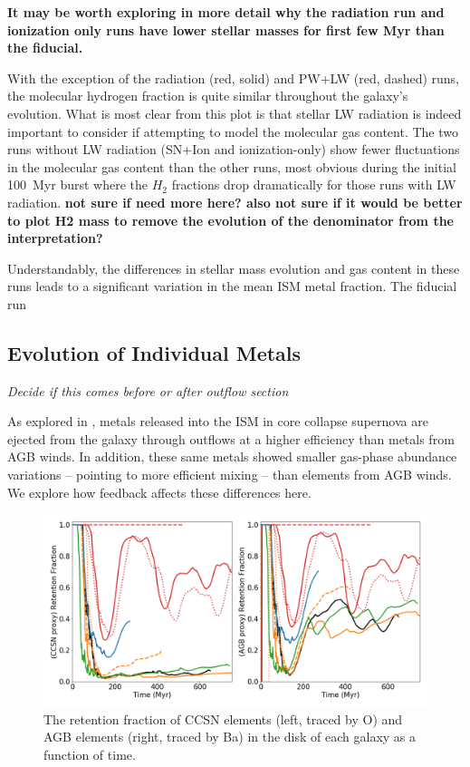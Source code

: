\documentclass[twocolumn]{aastex62}
\newcommand{\radstyle}{red, solid}
\newcommand{\pelwstyle}{red, dashed}
\begin{document}
\textbf{It may be worth exploring in more detail why the radiation run and ionization only runs have lower stellar masses for first few Myr than the fiducial.}

With the exception of the radiation (\radstyle) and PW+LW (\pelwstyle) runs, the molecular hydrogen fraction is quite similar throughout the galaxy's evolution. What is most clear from this plot is that stellar LW radiation is indeed important to consider if attempting to model the molecular gas content. The two runs without LW radiation (SN+Ion and ionization-only) show fewer fluctuations in the molecular gas content than the other runs, most obvious during the initial 100~Myr burst where the $H_2$ fractions drop dramatically for those runs with LW radiation. \textbf{not sure if need more here? also not sure if it would be better to plot H2 mass to remove the evolution of the denominator from the interpretation?}

Understandably, the differences in stellar mass evolution and gas content in these runs leads to a significant variation in the mean ISM metal fraction. The fiducial run 

\subsection{Evolution of Individual Metals}
\textit{Decide if this comes before or after outflow section}

As explored in \citep{Emerick2018b}, metals released into the ISM in core collapse supernova are ejected from the galaxy through outflows at a higher efficiency than metals from AGB winds. In addition, these same metals showed smaller gas-phase abundance variations -- pointing to more efficient mixing -- than elements from AGB winds. We explore how feedback affects these differences here.

\begin{figure}
  \centering
  \includegraphics[width=0.95\linewidth]{figures/physics_comparison_retention}
  \caption{The retention fraction of CCSN elements (left, traced by O) and AGB elements (right, traced by Ba) in the disk of each galaxy as a function of time.}
  \label{fig:retention}
\end{figure}
\end{document}
